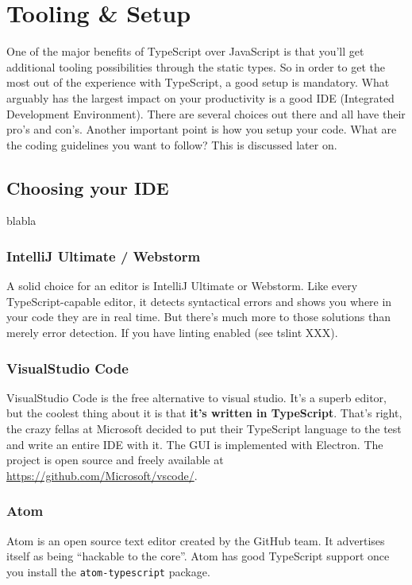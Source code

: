 \documentclass[12pt,a4paper]{report}
\begin{document}
\chapter{Tooling \& Setup}

One of the major benefits of TypeScript over JavaScript is that you'll get additional tooling possibilities through the static types. So in order to get the most out of the experience with TypeScript, a good setup is mandatory. What arguably has the largest impact on your productivity is a good IDE (Integrated Development Environment). There are several choices out there and all have their pro's and con's. Another important point is how you setup your code. What are the coding guidelines you want to follow? This is discussed later on.

\section{Choosing your IDE}

blabla

\subsection{IntelliJ Ultimate / Webstorm}
A solid choice for an editor is IntelliJ Ultimate or Webstorm. Like every TypeScript-capable editor, it detects syntactical errors and shows you where in your code they are in real time. But there's much more to those solutions than merely error detection. If you have linting enabled (see tslint XXX).

\subsection{VisualStudio Code}
VisualStudio Code is the free alternative to visual studio. It's a superb editor, but the coolest thing about it is that \textbf{it's written in TypeScript}. That's right, the crazy fellas at Microsoft decided to put their TypeScript language to the test and write an entire IDE with it. The GUI is implemented with Electron. The project is open source and freely available at \url{https://github.com/Microsoft/vscode/}.

\subsection{Atom}
Atom is an open source text editor created by the GitHub team. It advertises itself as being ``hackable to the core''. Atom has good TypeScript support once you install the \texttt{atom-typescript} package.
\end{document}
